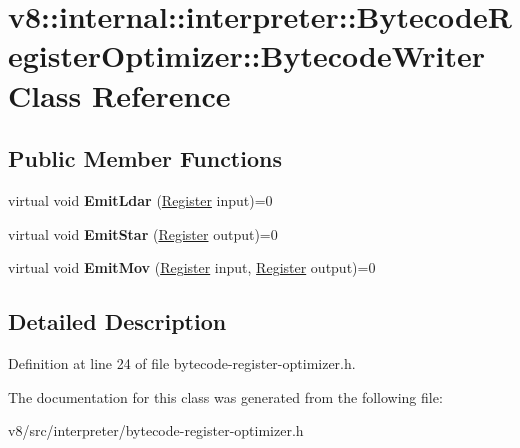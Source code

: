 \hypertarget{classv8_1_1internal_1_1interpreter_1_1BytecodeRegisterOptimizer_1_1BytecodeWriter}{}\section{v8\+:\+:internal\+:\+:interpreter\+:\+:Bytecode\+Register\+Optimizer\+:\+:Bytecode\+Writer Class Reference}
\label{classv8_1_1internal_1_1interpreter_1_1BytecodeRegisterOptimizer_1_1BytecodeWriter}
\subsection*{Public Member Functions}
\begin{DoxyCompactItemize}
\item 
\mbox{\label{classv8_1_1internal_1_1interpreter_1_1BytecodeRegisterOptimizer_1_1BytecodeWriter_ad731f16abb18f2d32db26993dccfa23d}} 
virtual void {\bfseries Emit\+Ldar} (\mbox{\hyperlink{classv8_1_1internal_1_1interpreter_1_1Register}{Register}} input)=0
\item 
\mbox{\label{classv8_1_1internal_1_1interpreter_1_1BytecodeRegisterOptimizer_1_1BytecodeWriter_a50dc7f5e9dffe2d66a6609fdd7125ad4}} 
virtual void {\bfseries Emit\+Star} (\mbox{\hyperlink{classv8_1_1internal_1_1interpreter_1_1Register}{Register}} output)=0
\item 
\mbox{\label{classv8_1_1internal_1_1interpreter_1_1BytecodeRegisterOptimizer_1_1BytecodeWriter_a5637ad31ca1c1a75eb6ce72f05e5af34}} 
virtual void {\bfseries Emit\+Mov} (\mbox{\hyperlink{classv8_1_1internal_1_1interpreter_1_1Register}{Register}} input, \mbox{\hyperlink{classv8_1_1internal_1_1interpreter_1_1Register}{Register}} output)=0
\end{DoxyCompactItemize}


\subsection{Detailed Description}


Definition at line 24 of file bytecode-\/register-\/optimizer.\+h.



The documentation for this class was generated from the following file\+:\begin{DoxyCompactItemize}
\item 
v8/src/interpreter/bytecode-\/register-\/optimizer.\+h\end{DoxyCompactItemize}
